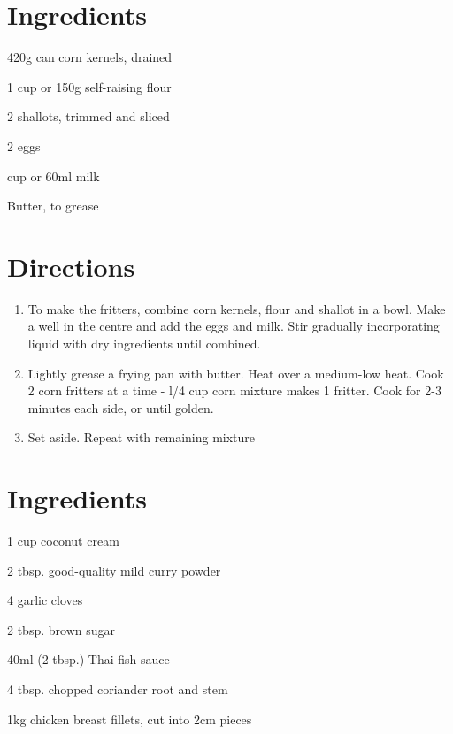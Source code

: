 \section*{Ingredients}
\begin{ingredients-list}
	\item 420g can corn kernels, drained
	\item 1 cup or 150g self-raising flour
	\item 2 shallots, trimmed and sliced
	\item 2 eggs
	\item {} cup or 60ml milk
	\item Butter, to grease
\end{ingredients-list}
\section*{Directions}
\begin{enumerate}
	\item To make the fritters, combine corn kernels, flour and shallot in a bowl. Make a well in the centre and add the eggs and milk.
		Stir gradually incorporating liquid with dry ingredients until combined.
	\item Lightly grease a frying pan with butter. Heat over a medium-low heat. Cook 2 corn fritters at a time - l/4 cup corn mixture makes 1 fritter.
		Cook for 2-3 minutes each side, or until golden.
	\item Set aside. Repeat with remaining mixture
\end{enumerate}

\section*{Ingredients}
\begin{ingredients-list}
	\item 1 cup coconut cream
	\item 2 tbsp. good-quality mild curry powder
	\item 4 garlic cloves
	\item 2 tbsp. brown sugar
	\item 40ml (2 tbsp.) Thai fish sauce
	\item 4 tbsp. chopped coriander root and stem
	\item 1kg chicken breast fillets, cut into 2cm pieces 
\end{ingredients-list}
